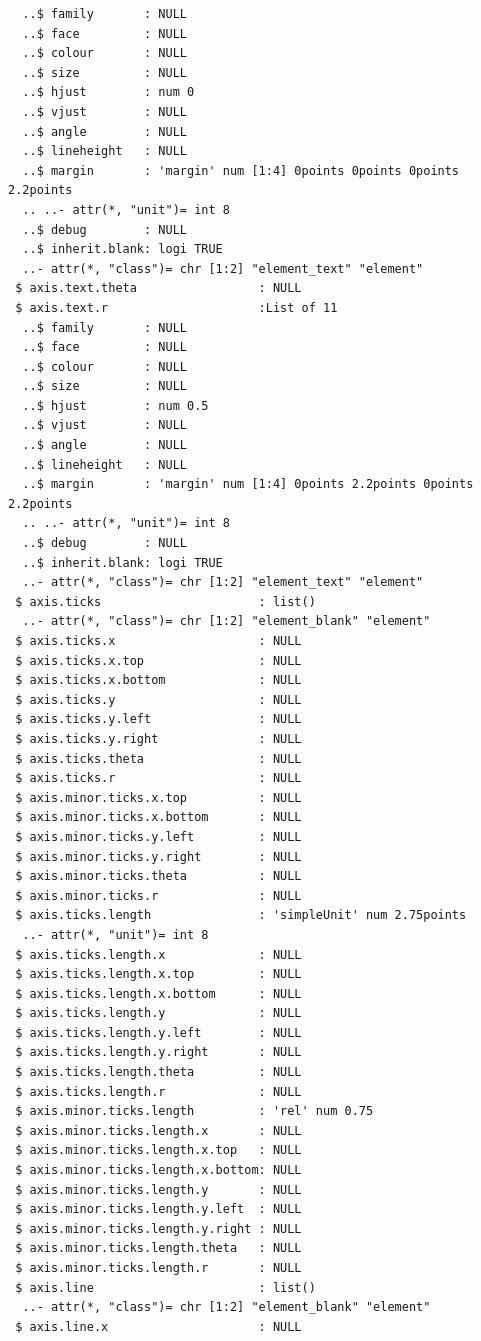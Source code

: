 \documentclass[
  letterpaper,
  DIV=11,
  numbers=noendperiod]{scrartcl}
\begin{document}
\begin{verbatim}
  ..$ family       : NULL
  ..$ face         : NULL
  ..$ colour       : NULL
  ..$ size         : NULL
  ..$ hjust        : num 0
  ..$ vjust        : NULL
  ..$ angle        : NULL
  ..$ lineheight   : NULL
  ..$ margin       : 'margin' num [1:4] 0points 0points 0points 2.2points
  .. ..- attr(*, "unit")= int 8
  ..$ debug        : NULL
  ..$ inherit.blank: logi TRUE
  ..- attr(*, "class")= chr [1:2] "element_text" "element"
 $ axis.text.theta                 : NULL
 $ axis.text.r                     :List of 11
  ..$ family       : NULL
  ..$ face         : NULL
  ..$ colour       : NULL
  ..$ size         : NULL
  ..$ hjust        : num 0.5
  ..$ vjust        : NULL
  ..$ angle        : NULL
  ..$ lineheight   : NULL
  ..$ margin       : 'margin' num [1:4] 0points 2.2points 0points 2.2points
  .. ..- attr(*, "unit")= int 8
  ..$ debug        : NULL
  ..$ inherit.blank: logi TRUE
  ..- attr(*, "class")= chr [1:2] "element_text" "element"
 $ axis.ticks                      : list()
  ..- attr(*, "class")= chr [1:2] "element_blank" "element"
 $ axis.ticks.x                    : NULL
 $ axis.ticks.x.top                : NULL
 $ axis.ticks.x.bottom             : NULL
 $ axis.ticks.y                    : NULL
 $ axis.ticks.y.left               : NULL
 $ axis.ticks.y.right              : NULL
 $ axis.ticks.theta                : NULL
 $ axis.ticks.r                    : NULL
 $ axis.minor.ticks.x.top          : NULL
 $ axis.minor.ticks.x.bottom       : NULL
 $ axis.minor.ticks.y.left         : NULL
 $ axis.minor.ticks.y.right        : NULL
 $ axis.minor.ticks.theta          : NULL
 $ axis.minor.ticks.r              : NULL
 $ axis.ticks.length               : 'simpleUnit' num 2.75points
  ..- attr(*, "unit")= int 8
 $ axis.ticks.length.x             : NULL
 $ axis.ticks.length.x.top         : NULL
 $ axis.ticks.length.x.bottom      : NULL
 $ axis.ticks.length.y             : NULL
 $ axis.ticks.length.y.left        : NULL
 $ axis.ticks.length.y.right       : NULL
 $ axis.ticks.length.theta         : NULL
 $ axis.ticks.length.r             : NULL
 $ axis.minor.ticks.length         : 'rel' num 0.75
 $ axis.minor.ticks.length.x       : NULL
 $ axis.minor.ticks.length.x.top   : NULL
 $ axis.minor.ticks.length.x.bottom: NULL
 $ axis.minor.ticks.length.y       : NULL
 $ axis.minor.ticks.length.y.left  : NULL
 $ axis.minor.ticks.length.y.right : NULL
 $ axis.minor.ticks.length.theta   : NULL
 $ axis.minor.ticks.length.r       : NULL
 $ axis.line                       : list()
  ..- attr(*, "class")= chr [1:2] "element_blank" "element"
 $ axis.line.x                     : NULL

\end{verbatim}
\end{document}
